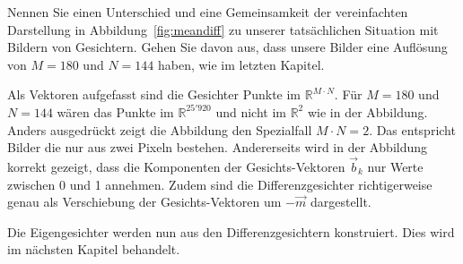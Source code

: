 \begin{aufgabe} \label{aufg:hmmc}
	Nennen Sie einen Unterschied und eine Gemeinsamkeit der vereinfachten Darstellung in Abbildung~\ref{fig:meandiff} zu unserer tatsächlichen Situation mit Bildern von Gesichtern.
	Gehen Sie davon aus, dass unsere Bilder eine Auflösung von $M=180$ und $N=144$ haben, wie im letzten Kapitel.
\end{aufgabe}
\begin{losung}
	Als Vektoren aufgefasst sind die Gesichter Punkte im $\mathbb R^{M\cdot N}$.
	Für $M=180$ und $N=144$ wären das Punkte im $\mathbb R^{25'920}$ und nicht im $\mathbb R^2$ wie in der Abbildung.
	Anders ausgedrückt zeigt die Abbildung den Spezialfall $M\cdot N=2$.
	Das entspricht Bilder die nur aus zwei Pixeln bestehen.
	Andererseits wird in der Abbildung korrekt gezeigt, dass die Komponenten der Gesichts-Vektoren $\vec b_k$ nur Werte zwischen 0 und 1 annehmen.
	Zudem sind die Differenzgesichter richtigerweise genau als Verschiebung der Gesichts-Vektoren um $-\vec m$ dargestellt.
\end{losung}
Die Eigengesichter werden nun aus den Differenzgesichtern konstruiert.
Dies wird im nächsten Kapitel behandelt.
%
%
%
